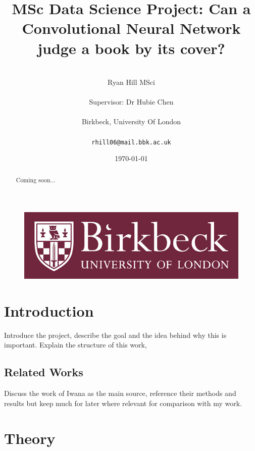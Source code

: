 \documentclass[12pt]{article}
\numberwithin{equation}{section}
\numberwithin{figure}{section}
\begin{document}
\renewcommand\citeform[1]{[#1]}
%
\title{MSc Data Science Project: Can a Convolutional Neural Network judge a book by its cover?}
\author{\\Ryan Hill MSci\\\\
Supervisor: Dr Hubie Chen\\\\
Birkbeck, University Of London\\\\
\texttt{rhill06@mail.bbk.ac.uk}}
\date{\today}
\maketitle
\thispagestyle{empty}
\graphicspath{{images/}}
\begin{abstract}
	Coming soon...
\end{abstract}
\begin{figure}[!b]
	\centering
	\includegraphics[scale=0.4]{bbk_logo.jpg}
\end{figure}

\clearpage
%
{\hypersetup{linkcolor=black}
\tableofcontents}
\thispagestyle{empty}
\clearpage
%
\setcounter{page}{1}
\section{Introduction} 
\label{sec:intro}

Introduce the project, describe the goal and the idea behind why this is important. Explain the structure of this work,

\subsection{Related Works} 
\label{sub:Related Works} 
Discuss the work of Iwana as the main source, reference their methods and results but keep much for later where relevant for comparison with my work.
\section{Theory} 
\label{sec:Theory} 
\end{document}
